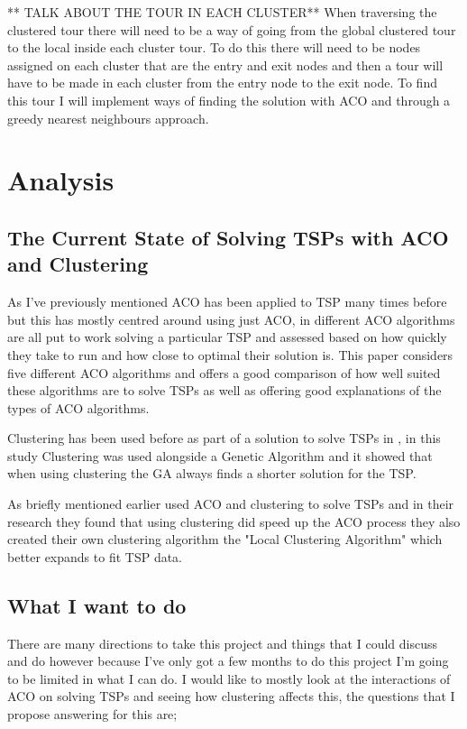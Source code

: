 ** TALK ABOUT THE TOUR IN EACH CLUSTER**
When traversing the clustered tour there will need to be a way of going from the global clustered tour to the local inside each cluster tour. To do this there will need to be nodes assigned on each cluster that are the entry and exit nodes and then a tour will have to be made in each cluster from the entry node to the exit node. To find this tour I will implement ways of finding the solution with ACO and through a greedy nearest neighbours approach.

\section{Analysis}

\subsection{The Current State of Solving TSPs with ACO and Clustering}
As I've previously mentioned ACO has been applied to TSP many times before but this has mostly centred around using just ACO, in \cite{assesmentdiffacofortsp} different ACO algorithms are all put to work solving a particular TSP and assessed based on how quickly they take to run and how close to optimal their solution is. This paper considers five different ACO algorithms and offers a good comparison of how well suited these algorithms are to solve TSPs as well as offering good explanations of the types of ACO algorithms. 

Clustering has been used before as part of a solution to solve TSPs in \cite{clustering_with_local_search_heuristic}, in this study Clustering was used alongside a Genetic Algorithm and it showed that when using clustering the GA always finds a shorter solution for the TSP.

As briefly mentioned earlier \cite{pang_chao-yang_ben-qiong_zhang_jie_wei_shan_zheng-chao_2014} used ACO and clustering to solve TSPs and in their research they found that using clustering did speed up the ACO process they also created their own clustering algorithm the "Local Clustering Algorithm" which better expands to fit TSP data. 

\subsection{What I want to do}
There are many directions to take this project and things that I could discuss and do however because I've only got a few months to do this project I'm going to be limited in what I can do. I would like to mostly look at the interactions of ACO on solving TSPs and seeing how clustering affects this, the questions that I propose answering for this are;

